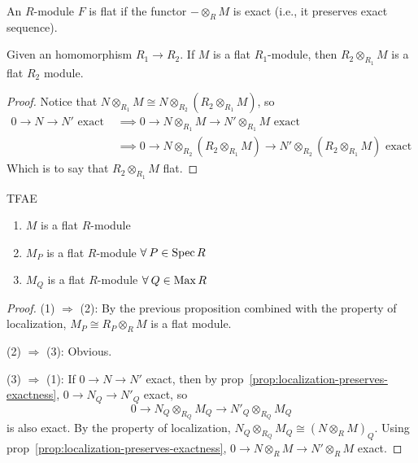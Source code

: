 \begin{definition}
  An $R$-module $F$ is  flat if the functor
  ${-} \otimes_R M$ is exact (i.e., it preserves exact sequence).
\end{definition}

\begin{prop}
  Given an homomorphism $R_1 \to R_2$.
  If $M$ is a flat $R_1$-module, then $R_2 \otimes_{R_1} M$ is a flat $R_2$ module.

  \begin{proof}
    Notice that $N \otimes_{R_1} M \cong N \otimes_{R_2} (R_2 \otimes_{R_1} M)$,
    so
    \begin{align*}
      0 \to N \to N' \text{ exact }
      &\implies 0 \to N \otimes_{R_1} M \to N' \otimes_{R_1} M \text{ exact } \\
      &\implies 0 \to N \otimes_{R_2} (R_2 \otimes_{R_1} M)
      \to N' \otimes_{R_2} (R_2 \otimes_{R_1} M) \text{ exact }
    \end{align*}
    Which is to say that $R_2 \otimes_{R_1} M$ flat.
  \end{proof}
\end{prop}

\begin{prop}
  TFAE
  \begin{enumerate}[(1)]
    \item $M$ is a flat $R$-module
    \item $M_P$ is a flat $R$-module $\forall P \in \Spec R$
    \item $M_Q$ is a flat $R$-module $\forall Q \in \Max R$
  \end{enumerate}

  \begin{proof}
    (1) $\Rightarrow$ (2): By the previous proposition combined with the property
    of localization, $M_P \cong R_P \otimes_R M$ is a flat module.

    (2) $\Rightarrow$ (3): Obvious.

    (3) $\Rightarrow$ (1):
    If $0 \to N \to N'$ exact, then by prop~\ref{prop:localization-preserves-exactness},
    $0 \to N_Q \to N'_Q$ exact, so
    \[ 0 \to N_Q \otimes_{R_Q} M_Q \to N'_Q \otimes_{R_Q} M_Q \]
    is also exact. By the property of localization, $N_Q \otimes_{R_Q} M_Q \cong (N \otimes_R M)_Q$.
    Using prop~\ref{prop:localization-preserves-exactness}, $0 \to N \otimes_R M \to N' \otimes_R M$ exact.
  \end{proof}
\end{prop}

